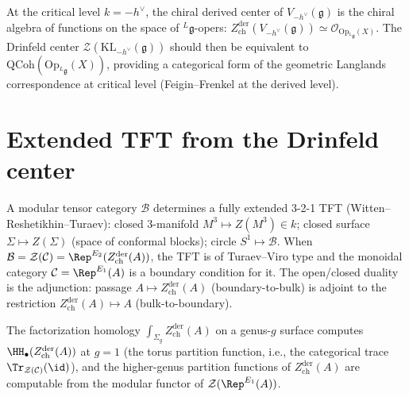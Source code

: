 \begin{conjecture}
\label{conj:thy-kl-opers}
\ClaimStatusConjectured
At the critical level $k=-h^\vee$, the chiral derived center of $V_{-h^\vee}(\mathfrak{g})$
is the chiral algebra of functions on the space of ${}^L\mathfrak{g}$-opers:
$Z^{\mathrm{der}}_{\mathrm{ch}}(V_{-h^\vee}(\mathfrak{g}))\simeq
\mathcal{O}_{\mathrm{Op}_{{}^L\!\mathfrak{g}}(X)}$.
The Drinfeld center $\mathcal{Z}(\mathrm{KL}_{-h^\vee}(\mathfrak{g}))$ should
then be equivalent to $\mathrm{QCoh}(\mathrm{Op}_{{}^L\!\mathfrak{g}}(X))$,
providing a categorical form of the geometric Langlands correspondence at
critical level (Feigin--Frenkel at the derived level).
\end{conjecture}

\section{Extended TFT from the Drinfeld center}
\label{sec:thy-dfc-tft}

\begin{construction}
\label{constr:thy-dfc-extended-tft}
A modular tensor category $\mathcal{B}$ determines a fully extended 3-2-1 TFT
(Witten--Reshetikhin--Turaev):
closed 3-manifold $M^3\mapsto Z(M^3)\in k$; closed surface $\Sigma\mapsto Z(\Sigma)$
(space of conformal blocks); circle $S^1\mapsto\mathcal{B}$.
When $\mathcal{B}=\mathcal{Z}(\mathcal{C})=\Rep^{E_2}(Z^{\mathrm{der}}_{\mathrm{ch}}(A))$,
the TFT is of Turaev--Viro type and the monoidal category
$\mathcal{C}=\Rep^{E_1}(A)$ is a boundary condition for it. The open/closed
duality is the adjunction: passage $A\mapsto Z^{\mathrm{der}}_{\mathrm{ch}}(A)$
(boundary-to-bulk) is adjoint to the restriction $Z^{\mathrm{der}}_{\mathrm{ch}}(A)\mapsto A$
(bulk-to-boundary).
\end{construction}

\begin{conjecture}
\label{conj:thy-dfc-higher-genus}
\ClaimStatusConjectured
The factorization homology $\int_{\Sigma_g}Z^{\mathrm{der}}_{\mathrm{ch}}(A)$
on a genus-$g$ surface computes $\HH_\bullet(Z^{\mathrm{der}}_{\mathrm{ch}}(A))$
at $g=1$ (the torus partition function, i.e., the categorical trace
$\Tr_{\mathcal{Z}(\mathcal{C})}(\id)$), and the higher-genus partition
functions of $Z^{\mathrm{der}}_{\mathrm{ch}}(A)$ are computable from the
modular functor of $\mathcal{Z}(\Rep^{E_1}(A))$.
\end{conjecture}
